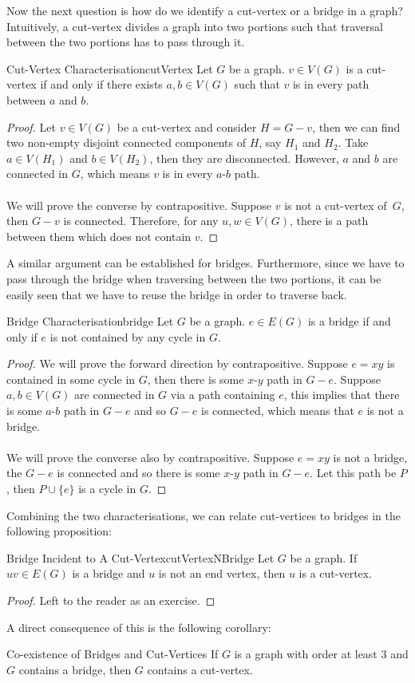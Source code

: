 \documentclass[math]{amznotes}
\theoremstyle{remark}
\newcommand{\0}{\mathbf{0}}
\newcommand{\1}{\mathbf{1}}
\begin{document}
Now the next question is how do we identify a cut-vertex or a bridge in a graph? Intuitively, a cut-vertex divides a graph into two portions such that traversal between the two portions has to pass through it.
\begin{thmbox}{Cut-Vertex Characterisation}{cutVertex}
    Let $G$ be a graph. $v \in V(G)$ is a cut-vertex if and only if there exists $a, b \in V(G)$ such that $v$ is in every path between $a$ and $b$.
    \tcblower
    \begin{proof}
        Let $v \in V(G)$ be a cut-vertex and consider $H = G - v$, then we can find two non-empty disjoint connected components of $H$, say $H_1$ and $H_2$. Take $a \in V(H_1)$ and $b \in V(H_2)$, then they are disconnected. However, $a$ and $b$ are connected in $G$, which means $v$ is in every $a$-$b$ path.
        \\\\
        We will prove the converse by contrapositive. Suppose $v$ is not a cut-vertex of~$G$, then $G - v$ is connected. Therefore, for any $u, w \in V(G)$, there is a path between them which does not contain $v$.
    \end{proof}
\end{thmbox}
A similar argument can be established for bridges. Furthermore, since we have to pass through the bridge when traversing between the two portions, it can be easily seen that we have to reuse the bridge in order to traverse back.
\begin{thmbox}{Bridge Characterisation}{bridge}
    Let $G$ be a graph. $e \in E(G)$ is a bridge if and only if $e$ is not contained by any cycle in $G$.
    \tcblower
    \begin{proof}
        We will prove the forward direction by contrapositive. Suppose $e = xy$ is contained in some cycle in $G$, then there is some $x$-$y$ path in $G - e$. Suppose $a, b \in V(G)$ are connected in $G$ via a path containing $e$, this implies that there is some $a$-$b$ path in $G - e$ and so $G - e$ is connected, which means that $e$ is not a bridge.
        \\\\
        We will prove the converse also by contrapositive. Suppose $e = xy$ is not a bridge, the $G - e$ is connected and so there is some $x$-$y$ path in $G - e$. Let this path be $P$, then $P \cup \{e\}$ is a cycle in $G$.
    \end{proof}
\end{thmbox}
Combining the two characterisations, we can relate cut-vertices to bridges in the following proposition:
\begin{probox}{Bridge Incident to A Cut-Vertex}{cutVertexNBridge}
    Let $G$ be a graph. If $uv \in E(G)$ is a bridge and $u$ is not an end vertex, then $u$ is a cut-vertex.
    \tcblower
    \begin{proof}
        Left to the reader as an exercise.
    \end{proof}
\end{probox}
A direct consequence of this is the following corollary:
\begin{corbox}{Co-existence of Bridges and Cut-Vertices}{}
    If $G$ is a graph with order at least $3$ and $G$ contains a bridge, then $G$ contains a cut-vertex.
\end{corbox}
\end{document}
